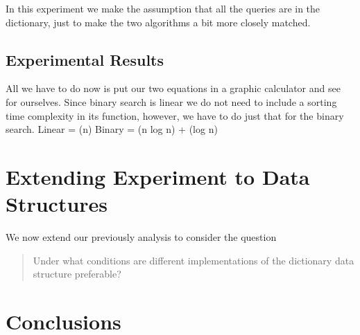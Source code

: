 \documentclass{article}
\begin{document}
In this experiment we make the assumption that all the queries are in the dictionary, just to make the two algorithms a bit more closely matched.


\subsection{Experimental Results}

All we have to do now is put our two equations in a graphic calculator and see for ourselves. Since binary search is linear we do not need to include a sorting time complexity in its function, however, we have to do just that for the binary search.
Linear = \theta(n)
Binary = \theta(n log n) + \theta(log n)



\section{Extending Experiment to Data Structures}
\label{sec:part3}

We now extend our previously analysis to consider the question
\begin{quote}
Under what conditions are different implementations of the dictionary data structure preferable?
\end{quote}

\section{Conclusions}
\label{sec:conclusions}
\end{document}

